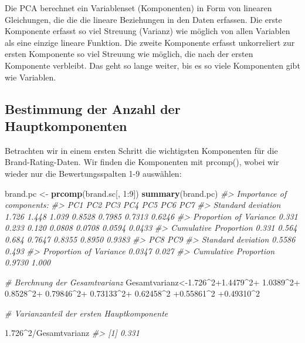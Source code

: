 \documentclass[12pt,]{book}
\makeatletter
\newenvironment{Shaded}{\begin{snugshade}}{\end{snugshade}}
\newcommand{\KeywordTok}[1]{\textcolor[rgb]{0.13,0.29,0.53}{\textbf{{#1}}}}
\newcommand{\DecValTok}[1]{\textcolor[rgb]{0.00,0.00,0.81}{{#1}}}
\newcommand{\FloatTok}[1]{\textcolor[rgb]{0.00,0.00,0.81}{{#1}}}
\newcommand{\StringTok}[1]{\textcolor[rgb]{0.31,0.60,0.02}{{#1}}}
\newcommand{\CommentTok}[1]{\textcolor[rgb]{0.56,0.35,0.01}{\textit{{#1}}}}
\newcommand{\NormalTok}[1]{{#1}}
\newenvironment{kframe}{%
\medskip{}
\setlength{\fboxsep}{.8em}
 \def\at@end@of@kframe{}%
 \ifinner\ifhmode%
  \def\at@end@of@kframe{\end{minipage}}%
  \begin{minipage}{\columnwidth}%
 \fi\fi%
 \def\FrameCommand##1{\hskip\@totalleftmargin \hskip-\fboxsep
 \colorbox{shadecolor}{##1}\hskip-\fboxsep
     \hskip-\linewidth \hskip-\@totalleftmargin \hskip\columnwidth}%
 \MakeFramed {\advance\hsize-\width
   \@totalleftmargin\z@ \linewidth\hsize
   \@setminipage}}%
 {\par\unskip\endMakeFramed%
 \at@end@of@kframe}
\renewenvironment{Shaded}{\begin{kframe}}{\end{kframe}}
\makeatother
\begin{document}
Die PCA berechnet ein Variablenset (Komponenten) in Form von linearen
Gleichungen, die die die lineare Beziehungen in den Daten erfassen. Die
erste Komponente erfasst so viel Streuung (Varianz) wie möglich von
allen Variablen als eine einzige lineare Funktion. Die zweite Komponente
erfasst unkorreliert zur ersten Komponente so viel Streuung wie möglich,
die nach der ersten Komponente verbleibt. Das geht so lange weiter, bis
es so viele Komponenten gibt wie Variablen.

\subsection{Bestimmung der Anzahl der
Hauptkomponenten}\label{bestimmung-der-anzahl-der-hauptkomponenten}

Betrachten wir in einem ersten Schritt die wichtigsten Komponenten für
die Brand-Rating-Daten. Wir finden die Komponenten mit prcomp(), wobei
wir wieder nur die Bewertungsspalten 1-9 auswählen:

\begin{Shaded}
\begin{Highlighting}[]
\NormalTok{brand.pc <-}\StringTok{ }\KeywordTok{prcomp}\NormalTok{(brand.sc[, }\DecValTok{1}\NormalTok{:}\DecValTok{9}\NormalTok{])}
\KeywordTok{summary}\NormalTok{(brand.pc)}
\CommentTok{#> Importance of components:}
\CommentTok{#>                          PC1   PC2   PC3    PC4    PC5    PC6    PC7}
\CommentTok{#> Standard deviation     1.726 1.448 1.039 0.8528 0.7985 0.7313 0.6246}
\CommentTok{#> Proportion of Variance 0.331 0.233 0.120 0.0808 0.0708 0.0594 0.0433}
\CommentTok{#> Cumulative Proportion  0.331 0.564 0.684 0.7647 0.8355 0.8950 0.9383}
\CommentTok{#>                           PC8   PC9}
\CommentTok{#> Standard deviation     0.5586 0.493}
\CommentTok{#> Proportion of Variance 0.0347 0.027}
\CommentTok{#> Cumulative Proportion  0.9730 1.000}
\end{Highlighting}
\end{Shaded}

\begin{Shaded}
\begin{Highlighting}[]
\CommentTok{# Berchnung der Gesamtvarianz}
\NormalTok{Gesamtvarianz<-}\FloatTok{1.726}\NormalTok{^}\DecValTok{2}\FloatTok{+1.4479}\NormalTok{^}\DecValTok{2}\NormalTok{+}\StringTok{ }\FloatTok{1.0389}\NormalTok{^}\DecValTok{2}\NormalTok{+}\StringTok{ }\FloatTok{0.8528}\NormalTok{^}\DecValTok{2}\NormalTok{+}\StringTok{ }\FloatTok{0.79846}\NormalTok{^}\DecValTok{2}\NormalTok{+}\StringTok{ }
\StringTok{  }\FloatTok{0.73133}\NormalTok{^}\DecValTok{2}\NormalTok{+}\StringTok{ }\FloatTok{0.62458}\NormalTok{^}\DecValTok{2} \NormalTok{+}\FloatTok{0.55861}\NormalTok{^}\DecValTok{2} \NormalTok{+}\FloatTok{0.49310}\NormalTok{^}\DecValTok{2}

\CommentTok{# Varianzanteil der ersten Hauptkomponente}

\FloatTok{1.726}\NormalTok{^}\DecValTok{2}\NormalTok{/Gesamtvarianz}
\CommentTok{#> [1] 0.331}
\end{Highlighting}
\end{Shaded}
\end{document}
